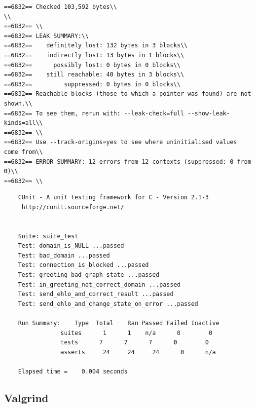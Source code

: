 \documentclass[a4paper,12pt]{report}
\begin{document}
\begin{verbatim}
==6832== Checked 103,592 bytes\\
\\
==6832== \\
==6832== LEAK SUMMARY:\\
==6832==    definitely lost: 132 bytes in 3 blocks\\
==6832==    indirectly lost: 13 bytes in 1 blocks\\
==6832==      possibly lost: 0 bytes in 0 blocks\\
==6832==    still reachable: 40 bytes in 3 blocks\\
==6832==         suppressed: 0 bytes in 0 blocks\\
==6832== Reachable blocks (those to which a pointer was found) are not shown.\\
==6832== To see them, rerun with: --leak-check=full --show-leak-kinds=all\\
==6832== \\
==6832== Use --track-origins=yes to see where uninitialised values come from\\
==6832== ERROR SUMMARY: 12 errors from 12 contexts (suppressed: 0 from 0)\\
==6832== \\
\end{verbatim}

\begin{verbatim}
    CUnit - A unit testing framework for C - Version 2.1-3
     http://cunit.sourceforge.net/


    Suite: suite_test
    Test: domain_is_NULL ...passed
    Test: bad_domain ...passed
    Test: connection_is_blocked ...passed
    Test: greeting_bad_graph_state ...passed
    Test: in_greeting_not_correct_domain ...passed
    Test: send_ehlo_and_correct_result ...passed
    Test: send_ehlo_and_change_state_on_error ...passed

    Run Summary:    Type  Total    Ran Passed Failed Inactive
                suites      1      1    n/a      0        0
                tests      7      7      7      0        0
                asserts     24     24     24      0      n/a

    Elapsed time =    0.004 seconds
\end{verbatim}

\subsection*{Valgrind}
\end{document}
